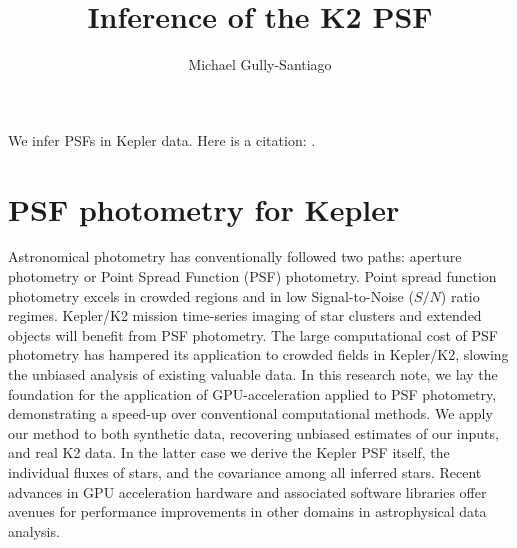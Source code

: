 \documentclass{rnaastex}
\begin{document}
\title{Inference of the K2 PSF}


\author[0000-0002-4020-3457]{Michael Gully-Santiago}


\section{}

We infer PSFs in Kepler data.  Here is a citation: \cite{2015Natur.521..332O}.

\section{PSF photometry for Kepler}
Astronomical photometry has conventionally followed two paths: aperture photometry or Point Spread Function (PSF) photometry.  Point spread function photometry excels in crowded regions and in low Signal-to-Noise ($S/N$) ratio regimes.  Kepler/K2 mission time-series imaging of star clusters and extended objects will benefit from PSF photometry.  The large computational cost of PSF photometry has hampered its application to crowded fields in Kepler/K2, slowing the unbiased analysis of existing valuable data. In this research note, we lay the foundation for the application of GPU-acceleration applied to PSF photometry, demonstrating a speed-up over conventional computational methods.  We apply our method to both synthetic data, recovering unbiased estimates of our inputs, and real K2 data.  In the latter case we derive the Kepler PSF itself, the individual fluxes of stars, and the covariance among all inferred stars.  Recent advances in GPU acceleration hardware and associated software libraries offer avenues for performance improvements in other domains in astrophysical data analysis.
\end{document}
